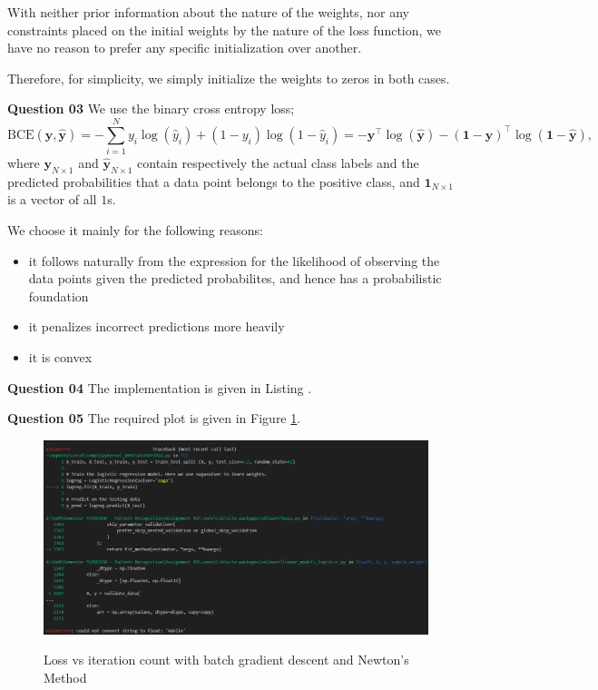 \documentclass{article}[a4paper]
\begin{document}
	With neither prior information about the nature of the weights, nor any constraints placed on the initial weights by the nature of the loss function, we have no reason to prefer any specific initialization over another.
	
	Therefore, for simplicity, we simply initialize the weights to zeros in both cases.
	\medskip

	\textbf{Question 03} We use the binary cross entropy loss; \[
		\text{BCE}\left(\mathbf{y}, \hat{\mathbf{y}}\right)
		=
		-\sum_{i = 1}^N
			y_i \log\left( \hat{y}_i \right)
			+
			\left( 1 - y_i \right) \log\left( 1 - \hat{y}_i \right)
		=
		-\mathbf{y}^\top \log\left( \hat{\mathbf{y}} \right)
		-\left(\mathbf{1} - \mathbf{y}\right)^\top \log\left( \mathbf{1} - \hat{\mathbf{y}} \right),
	\]
	where $\mathbf{y}_{N \times 1}$ and $\hat{\mathbf{y}}_{N \times 1}$ contain respectively the actual class labels and the predicted probabilities that a data point belongs to the positive class, and $\mathbf{1}_{N \times 1}$ is a vector of all $1$s.

	We choose it mainly for the following reasons:
	\begin{itemize}[noitemsep]
		\item it follows naturally from the expression for the likelihood of observing the data points given the predicted probabilites, and hence has a probabilistic foundation
		\item it penalizes incorrect predictions more heavily
		\item it is convex
	\end{itemize}
	\medskip

	\textbf{Question 04} The implementation is given in Listing .
	\medskip

	\textbf{Question 05} The required plot is given in Figure \ref{q3_5}.

	\begin{figure}[H]
		\centering
		\includegraphics[width=0.8\linewidth]{images/error.png}
		\label{q3_5}
		\caption{Loss vs iteration count with batch gradient descent and Newton's Method}
	\end{figure}
	
\end{document}

